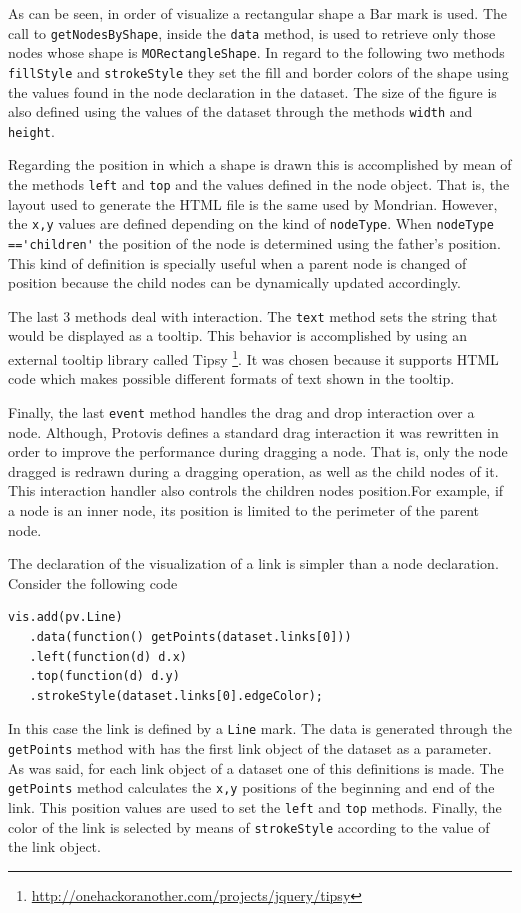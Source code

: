 \documentclass[preprint,10pt]{sigplanconf}
\newcommand{\ct}{\lstinline[backgroundcolor=\color{white},basicstyle=\footnotesize\ttfamily]}
\begin{document}
As can be seen, in order of visualize a rectangular shape a Bar mark is used. The call to \ct{getNodesByShape}, inside the \ct{data} method, is used to retrieve only those nodes whose shape is \ct{MORectangleShape}. In regard to the following two methods \ct{fillStyle} and \ct{strokeStyle} they set the fill and border colors of the shape using the values found in the node declaration in the dataset. The size of the figure is also defined using the values of the dataset through the methods \ct{width} and \ct{height}.

Regarding the position in which a shape is drawn this is accomplished by mean of the methods \ct{left} and \ct{top} and the values defined in the node object. That is, the layout used to generate the HTML file is the same used by Mondrian. However, the \ct{x,y} values are defined depending on the kind of \ct{nodeType}. When \ct{nodeType =='children'} the position of the node is determined using the father's position. This kind of definition is specially useful when a parent node is changed of position because the child nodes can be dynamically updated accordingly.  

The last 3 methods deal with interaction. The \ct{text} method sets the string that would be displayed as a tooltip. This behavior is accomplished by using an external tooltip library called Tipsy \footnote{\url{http://onehackoranother.com/projects/jquery/tipsy}}. It was chosen because it supports HTML code which makes possible different formats of text shown in the tooltip. 

Finally, the last \ct{event} method handles the drag and drop interaction over a node. Although, Protovis defines a standard drag interaction it was rewritten in order to improve the performance during dragging a node. That is,  only the node dragged is redrawn during a dragging operation, as well as the child nodes of it. This interaction handler also controls the children nodes position.For example, if a node is an inner node, its position is limited to the perimeter of the parent node.

The declaration of the visualization of a link is simpler than a node declaration. Consider the following code 
\begin{lstlisting} 
vis.add(pv.Line)
   .data(function() getPoints(dataset.links[0]))
   .left(function(d) d.x)
   .top(function(d) d.y)
   .strokeStyle(dataset.links[0].edgeColor);
\end{lstlisting}
In this case the link is defined by a \ct{Line} mark. The data is generated through the \ct{getPoints} method with has the first link object of the dataset as a parameter. As was said, for each link object of a dataset one of this definitions is made. The \ct{getPoints} method calculates the \ct{x,y} positions of the beginning and end of the link. This position values are used to set the \ct{left} and \ct{top} methods. Finally, the color of the link is selected by means of \ct{strokeStyle} according to the value of the link object.
\end{document}
